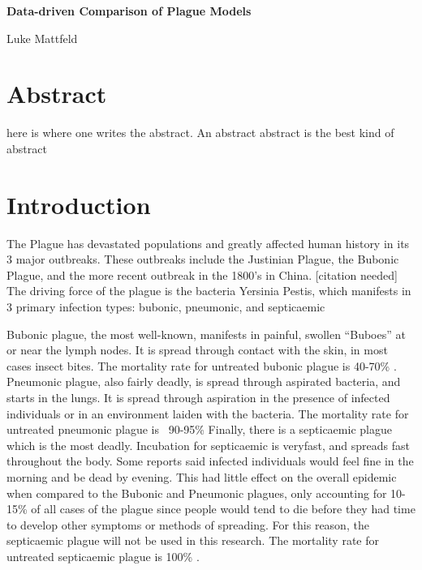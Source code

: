 \documentclass [letterpaper, 12pt] {article}
\begin{document}
	\begin{titlepage}
	\centering
	\vspace*{\fill}

	\vspace*{0.5cm}

	\huge\bfseries
	Data-driven Comparison of Plague Models
	
	\vspace*{0.5cm}

	\large Luke Mattfeld

	\vspace*{\fill}
	\end{titlepage}

\tableofcontents
\newpage
{}

\section {Abstract}

here is where one writes the abstract. An abstract abstract is the best kind of abstract

\pagebreak

\section {Introduction}

The Plague has devastated populations and greatly affected human history in its 3 major outbreaks. These outbreaks include the Justinian Plague, the Bubonic Plague, and the more recent outbreak in the 1800’s in China. [citation needed]
The driving force of the plague is the bacteria Yersinia Pestis, which manifests in 3 primary infection types: bubonic, pneumonic, and septicaemic

Bubonic plague, the most well-known, manifests in painful, swollen “Buboes” at or near the lymph nodes. It is spread through contact with the skin, in most cases insect bites. The mortality rate for untreated bubonic plague is 40-70\% \cite{ditchburn_hodgkins_2019} . Pneumonic plague, also fairly deadly, is spread through aspirated bacteria, and starts in the lungs. It is spread through aspiration in the presence of infected individuals or in an environment laiden with the bacteria. The mortality rate for untreated pneumonic plague is ~90-95\% Finally, there is a septicaemic plague which is the most deadly. Incubation for septicaemic is veryfast, and spreads fast throughout the body. Some reports said infected individuals would feel fine in the morning and be dead by evening. This had little effect on the overall epidemic when compared to the Bubonic and Pneumonic plagues, only accounting for 10-15\% of all cases of the plague since people would tend to die before they had time to develop other symptoms or methods of spreading. For this reason, the septicaemic plague will not be used in this research. The mortality rate for untreated septicaemic plague is 100\% \cite{ditchburn_hodgkins_2019}.
\end{document}
